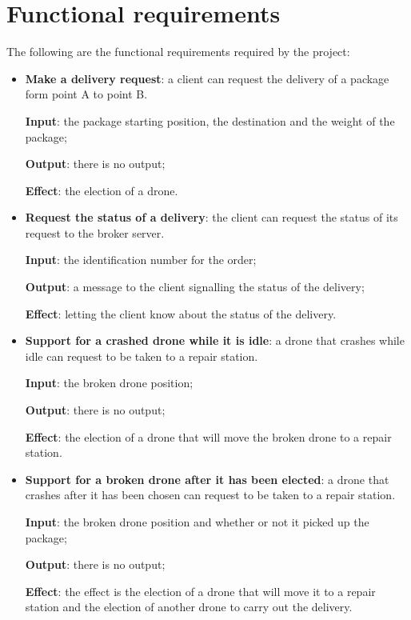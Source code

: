 \documentclass[a4paper, oneside]{memoir}
\begin{document}
\section{Functional requirements}
\label{func-req}

The following are the functional requirements required by the project:
\begin{itemize}
\item \textbf{Make a delivery request}: a client can request the delivery of a package form point A to point B.

	\textbf{Input}: the package starting position, the destination and the weight of the package;

	\textbf{Output}: there is no output;

	\textbf{Effect}: the election of a drone.

\item \textbf{Request the status of a delivery}: the client can request the status of its request to the broker server.

 	\textbf{Input}: the identification number for the order;

	\textbf{Output}: a message to the client signalling the status of the delivery;

	\textbf{Effect}: letting the client know about the status of the delivery.

\item \textbf{Support for a crashed drone while it is idle}: a drone that crashes while idle can request to be taken to a repair station.

	\textbf{Input}: the broken drone position;

	\textbf{Output}: there is no output;

	\textbf{Effect}: the election of a drone that will move the broken drone to a repair station.

\item \textbf{Support for a broken drone after it has been elected}: a drone that crashes after it has been chosen can request to be taken to a repair station.

	\textbf{Input}: the broken drone position and whether or not it picked up the package;

	\textbf{Output}: there is no output;

	\textbf{Effect}: the effect is the election of a drone that will move it to a repair station and the election of another drone to carry out the delivery.


\end{itemize}
\end{document}
